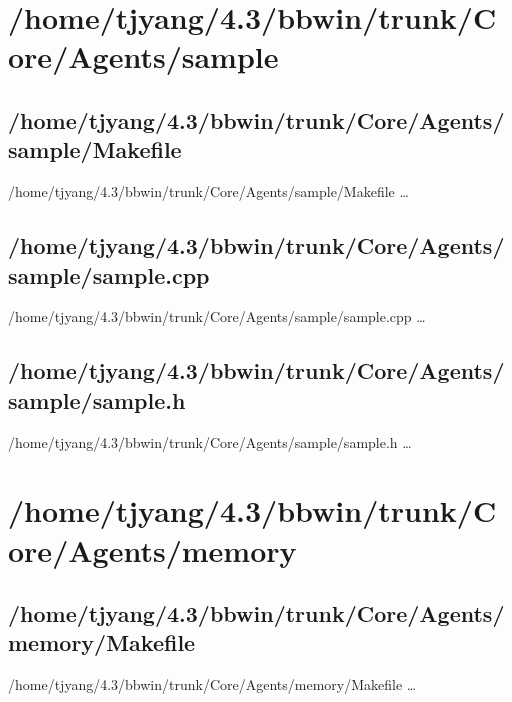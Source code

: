 \section{/home/tjyang/4.3/bbwin/trunk/Core/Agents/sample}



\subsection{/home/tjyang/4.3/bbwin/trunk/Core/Agents/sample/Makefile}
\lstset{numberstyle=\tiny,numbers=left,
   breaklines=true,
   stepnumber=1,numbersep=5pt,firstnumber=1,
   xleftmargin=12pt,showstringspaces=false}
\noindent /home/tjyang/4.3/bbwin/trunk/Core/Agents/sample/Makefile  \ldots



\subsection{/home/tjyang/4.3/bbwin/trunk/Core/Agents/sample/sample.cpp}
\lstset{numberstyle=\tiny,numbers=left,
   breaklines=true,
   stepnumber=1,numbersep=5pt,firstnumber=1,
   xleftmargin=12pt,showstringspaces=false}
\noindent /home/tjyang/4.3/bbwin/trunk/Core/Agents/sample/sample.cpp  \ldots



\subsection{/home/tjyang/4.3/bbwin/trunk/Core/Agents/sample/sample.h}
\lstset{numberstyle=\tiny,numbers=left,
   breaklines=true,
   stepnumber=1,numbersep=5pt,firstnumber=1,
   xleftmargin=12pt,showstringspaces=false}
\noindent /home/tjyang/4.3/bbwin/trunk/Core/Agents/sample/sample.h  \ldots





\section{/home/tjyang/4.3/bbwin/trunk/Core/Agents/memory}

\subsection{/home/tjyang/4.3/bbwin/trunk/Core/Agents/memory/Makefile}
\lstset{numberstyle=\tiny,numbers=left,
   breaklines=true,
   stepnumber=1,numbersep=5pt,firstnumber=1,
   xleftmargin=12pt,showstringspaces=false}
\noindent /home/tjyang/4.3/bbwin/trunk/Core/Agents/memory/Makefile  \ldots




